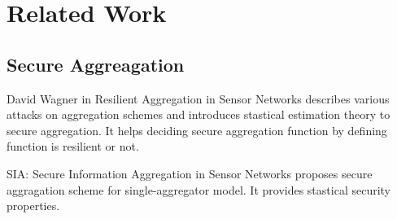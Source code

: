 \chapter{Related Work}

\section{Secure Aggreagation}

David Wagner in Resilient Aggregation in Sensor Networks describes various attacks on aggregation schemes and introduces stastical estimation theory to secure aggregation. It helps deciding secure aggregation function by defining function is resilient or not.

SIA: Secure Information Aggregation in Sensor Networks proposes secure aggragation scheme for single-aggregator model. It provides stastical security properties.
